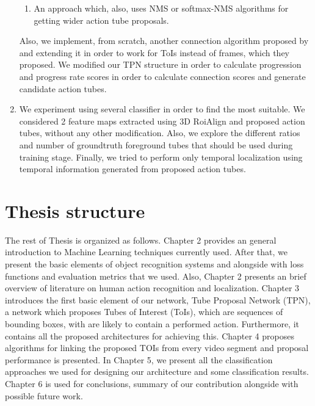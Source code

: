 \begin{enumerate}
\begin{enumerate}
  \item An approach which, also, uses NMS or softmax-NMS algorithms for getting wider action tube proposals.
  \end{enumerate}
  Also, we implement, from scratch, another connection algorithm proposed by \cite{DBLP:journals/corr/abs-1903-00304} and extending it in order to work for ToIs instead of frames, which they proposed.
  We modified our TPN structure in order to calculate progression and progress rate scores in order to calculate connection scores and generate candidate action tubes.
\item We experiment using several classifier in order to find the most suitable. We considered 2 feature maps extracted using 3D RoiAlign and proposed action tubes, without any other
  modification. Also, we explore the different ratios and number of groundtruth foreground tubes that should be used during training
  stage. Finally, we tried to perform only temporal localization using temporal information generated from proposed action tubes.
\end{enumerate}

\section{Thesis structure}
The rest of Thesis is organized as follows. Chapter 2 provides an general introduction to Machine Learning techniques currently used.
After that, we present the basic elements of object recognition systems and alongside with loss functions and evaluation metrics that
we used. Also, Chapter 2 presents an brief overview of literature on human action recognition and localization. Chapter 3 introduces the first basic element of our network, Tube Proposal Network (TPN), a network which proposes Tubes of Interest (ToIs), which are sequences of bounding boxes, with are likely to contain a performed action. Furthermore, it contains all the proposed architectures for achieving this.
Chapter 4 proposes algorithms for linking the proposed TOIs from every video segment and proposal performance is presented.
In Chapter 5, we present all the classification approaches we used for designing our architecture and some classification results.
Chapter 6 is used for conclusions, summary of our contribution alongside with possible future work.

% 
